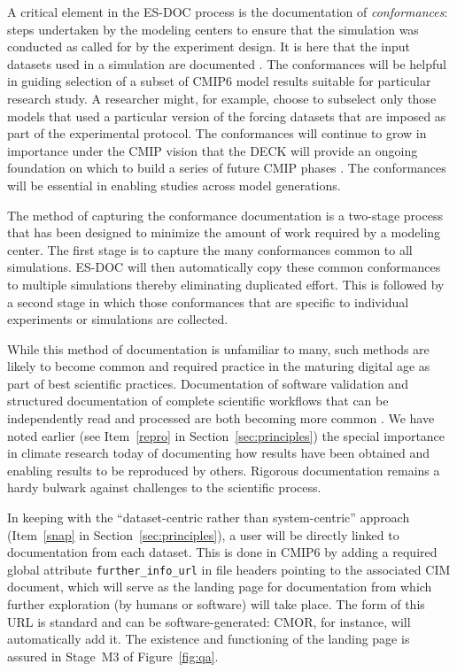 \documentclass[gmd,manuscript]{copernicus}
\newcommand{\pllabel}[1]{\label{p-#1}\linelabel{l-#1}}
\begin{document}
A critical element in the ES-DOC process is the documentation of
\emph{conformances}: steps undertaken by the modeling centers to
ensure that the simulation was conducted as called for by the
experiment design. It is here that the input
datasets used in a simulation are documented \citep[e.g., the version of each of
the forcing datasets, see][]{ref:duracketal2017}. The conformances
will be helpful in guiding selection of a subset of CMIP6
model results suitable for particular research study. A researcher might, for
example, choose to subselect only those models that used a particular
version of the forcing datasets that are imposed as part of the
experimental protocol. The conformances will continue to grow in
importance under the CMIP vision that the DECK will provide an ongoing
foundation on which to build a series of future CMIP phases
\citep[shown schematically in Figure~1 of][]{ref:eyringetal2016a}. The
conformances will be essential in enabling studies across model
generations.

The method of capturing the conformance documentation is a two-stage
process that has been designed to minimize the amount of work required
by a modeling center. The first stage is to capture the many
conformances common to all simulations. ES-DOC will then automatically
copy these common conformances to multiple simulations thereby
eliminating duplicated effort. This is followed by a second stage in
which those conformances that are specific to individual experiments
or simulations are collected.

While this method of documentation is unfamiliar to many, such methods
are likely to become common and required practice in the maturing
digital age as part of best scientific practices. Documentation of
software validation \citep[see e.g][]{ref:peng2011} and structured
documentation of complete scientific workflows that can be
independently read and processed are both becoming more common
\citep[see the special issue on the ``Geoscience Paper of the
Future'', ][]{ref:davidetal2016}. We have noted earlier
\pllabel{RC2-32}
(see Item~\ref{repro} in Section~\ref{sec:principles}) the special
importance in climate research today of documenting how results have
been obtained and enabling results to be reproduced by others.
Rigorous documentation remains a hardy bulwark against challenges to
the scientific process.

In keeping with the ``dataset-centric rather than system-centric''
approach (Item~\ref{snap} in Section~\ref{sec:principles}), a user
will be directly linked to documentation from each dataset. This is
done in CMIP6 by
\pllabel{RC1-55}
adding a required global attribute \texttt{further\_info\_url} in file
headers pointing to the associated CIM document, which will serve as
the landing page for documentation from which further exploration (by
humans or software) will take place. The form of this URL is standard
and can be software-generated: CMOR, for instance, will automatically
add it. The existence and functioning of the landing page is assured
in Stage~M3 of Figure~\ref{fig:qa}.
\end{document}
